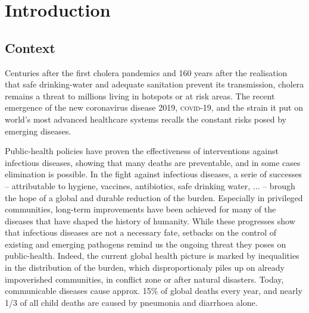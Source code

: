 \chapter*{Introduction} 

 \section{Context}
 Centuries after the first cholera pandemics and 160 years after the realisation that safe drinking-water and adequate sanitation prevent its transmission, cholera remains a threat to millions living in hotspots or at risk areas. The recent emergence of the new coronavirus disease 2019, \textsc{covid}-19, and the strain it put on world's most advanced healthcare systems recalls the constant risks posed by emerging diseases. 
 
 Public-health policies have proven the effectiveness of interventions against infectious diseases, showing that many deaths are preventable, and in some cases elimination is possible. In the fight against infectious diseases, a serie of successes -- attributable to \eg hygiene, vaccines, antibiotics, safe drinking water, ... -- brough the hope of a global and durable reduction of the burden. Especially in privileged communities, long-term improvements have been achieved for many of the diseases that have shaped the history of humanity. While these progresses show that infectious diseases are not a necessary fate, setbacks on the control of existing and emerging pathogens remind us the ongoing threat they poses on public-health. 
  Indeed, the current global health picture is marked by inequalities in the distribution of the burden, which disproportionaly piles up on already impoverished communities, in conflict zone or after natural disasters. Today, communicable diseases cause approx. 15\% of global deaths every year\cite[-4\baselineskip][tab. 1, excl. non-transmissible neonatal and maternal diseases and nutritional diseases; pre-\textsc{covid}-19 estimates]{Roth:GlobalRegionalNational:2018}, and nearly 1/3 of all child deaths are caused by pneumonia and diarrhoea alone\cite[][\textsc{m} deaths among under 5, every year.]{WHO:EndingPreventableChild:2013}.  
  
